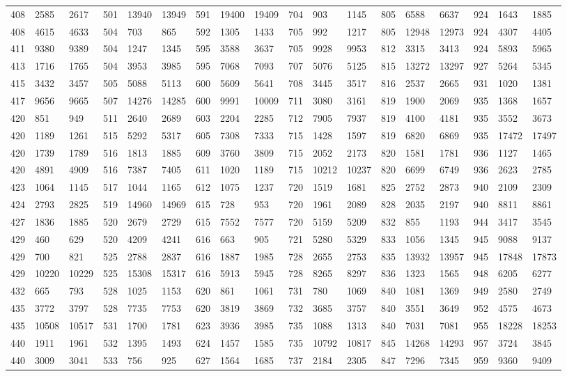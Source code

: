 \begin{center}
\begin{longtable}{*5{A@{\hspace*{5mm}}A}}
408&2585&2617&501&13940&13949&591&19400&19409&704&903&1145&805&6588&6637&924&1643&1885\\
408&4615&4633&504&703&865&592&1305&1433&705&992&1217&805&12948&12973&924&4307&4405\\
411&9380&9389&504&1247&1345&595&3588&3637&705&9928&9953&812&3315&3413&924&5893&5965\\
413&1716&1765&504&3953&3985&595&7068&7093&707&5076&5125&815&13272&13297&927&5264&5345\\
415&3432&3457&505&5088&5113&600&5609&5641&708&3445&3517&816&2537&2665&931&1020&1381\\
417&9656&9665&507&14276&14285&600&9991&10009&711&3080&3161&819&1900&2069&935&1368&1657\\
420&851&949&511&2640&2689&603&2204&2285&712&7905&7937&819&4100&4181&935&3552&3673\\
420&1189&1261&515&5292&5317&605&7308&7333&715&1428&1597&819&6820&6869&935&17472&17497\\
420&1739&1789&516&1813&1885&609&3760&3809&715&2052&2173&820&1581&1781&936&1127&1465\\
420&4891&4909&516&7387&7405&611&1020&1189&715&10212&10237&820&6699&6749&936&2623&2785\\
423&1064&1145&517&1044&1165&612&1075&1237&720&1519&1681&825&2752&2873&940&2109&2309\\
424&2793&2825&519&14960&14969&615&728&953&720&1961&2089&828&2035&2197&940&8811&8861\\
427&1836&1885&520&2679&2729&615&7552&7577&720&5159&5209&832&855&1193&944&3417&3545\\
429&460&629&520&4209&4241&616&663&905&721&5280&5329&833&1056&1345&945&9088&9137\\
429&700&821&525&2788&2837&616&1887&1985&728&2655&2753&835&13932&13957&945&17848&17873\\
429&10220&10229&525&15308&15317&616&5913&5945&728&8265&8297&836&1323&1565&948&6205&6277\\
432&665&793&528&1025&1153&620&861&1061&731&780&1069&840&1081&1369&949&2580&2749\\
435&3772&3797&528&7735&7753&620&3819&3869&732&3685&3757&840&3551&3649&952&4575&4673\\
435&10508&10517&531&1700&1781&623&3936&3985&735&1088&1313&840&7031&7081&955&18228&18253\\
440&1911&1961&532&1395&1493&624&1457&1585&735&10792&10817&845&14268&14293&957&3724&3845\\
440&3009&3041&533&756&925&627&1564&1685&737&2184&2305&847&7296&7345&959&9360&9409\\

\end{longtable}
\end{center}
